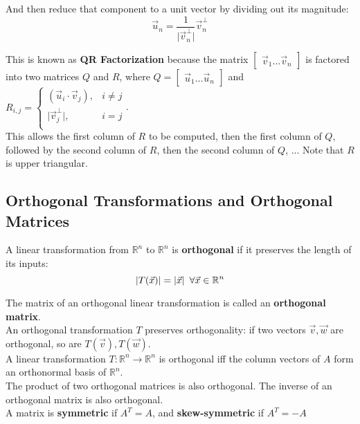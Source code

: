 \documentclass[]{scrartcl}
\begin{document}
	And then reduce that component to a unit vector by dividing out its magnitude:
	$$
	\vec{u}_n = \frac{1}{\lvert \vec{v}_{n}^{\perp} \rvert} \vec{v}_{n}^{\perp}
	$$
	
	This is known as \textbf{QR Factorization} because the matrix $\begin{bmatrix}
	\vec{v}_1 \ldots \vec{v}_n
	\end{bmatrix}$ is factored into two matrices $Q$ and $R$, where $Q = \begin{bmatrix}
	\vec{u}_1 \ldots \vec{u}_n
	\end{bmatrix}$
	and $R_{i, j} = \begin{cases}
	(\vec{u}_i \cdot \vec{v}_j), & i \neq j\\
	\lvert \vec{v}_{j}^{\perp} \rvert, & i = j\\
	\end{cases}$.\\
	
	This allows the first column of $R$ to be computed, then the first column of $Q$, followed by the second column of $R$, then the second column of $Q$, ... Note that $R$ is upper triangular.
	
	\subsection{Orthogonal Transformations and Orthogonal Matrices}
	A linear transformation from $\mathbb{R}^n$ to $\mathbb{R}^n$ is \textbf{orthogonal} if it preserves the length of its inputs:
	$$
	\lvert T(\vec{x}) \rvert = \lvert \vec{x} \rvert \enskip \forall \vec{x} \in \mathbb{R}^n
	$$
	
	The matrix of an orthogonal linear transformation is called an \textbf{orthogonal matrix}.\\
	
	An orthogonal transformation $T$ preserves orthogonality: if two vectors $\vec{v}, \vec{w}$ are orthogonal, so are $T(\vec{v}), T(\vec{w})$.\\
	
	A linear transformation $T: \mathbb{R}^n \rightarrow \mathbb{R}^n$ is orthogonal iff the column vectors of $A$ form an orthonormal basis of $\mathbb{R}^n$.\\
	
	The product of two orthogonal matrices is also orthogonal. The inverse of an orthogonal matrix is also orthogonal.\\
	
	A matrix is \textbf{symmetric} if $A^T = A$, and \textbf{skew-symmetric} if $A^T = -A$\\
	
\end{document}
